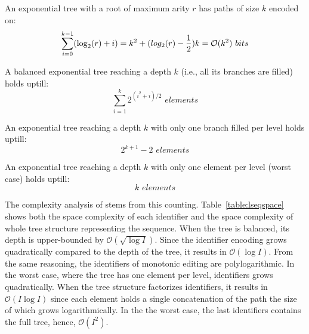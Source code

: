 \begin{asparadesc}
  An exponential tree with a root of maximum arity $r$ has paths of size $k$
  encoded on:
  \begin{equation}
    \sum\limits_{i=0}^{k-1}(\log_2(r)+i) =k^2+(log_2(r)-{1\over{2}})k =
    \mathcal{O}(k^2) \,\, bits
  \end{equation}

  A balanced exponential tree reaching a depth $k$ (i.e., all its branches are
  filled) holds uptill:
  \begin{equation}
    \sum\limits_{i=1}^{k} {2^{(i^2+i)/2}} \,\, elements
  \end{equation}

  An exponential tree reaching a depth $k$ with only one branch filled per level
  holds uptill:
  \begin{equation}
    2^{k+1}-2 \,\, elements
  \end{equation}

  An exponential tree reaching a depth $k$ with only one element per level
  (worst case) holds uptill: 
  \begin{equation}
    k \,\, elements
  \end{equation}

  
\item [The complexity analysis of \LSEQ] stems from this
  counting. Table~\ref{table:lseqspace} shows both the space complexity of each
  identifier and the space complexity of whole tree structure representing the
  sequence. When the tree is balanced, its depth is upper-bounded by
  $\mathcal{O}(\sqrt{\log I})$. Since the identifier encoding grows
  quadratically compared to the depth of the tree, it results in
  $\mathcal{O}(\log I)$. From the same reasoning, the identifiers of monotonic
  editing are polylogarithmic. In the worst case, where the tree has one element
  per level, identifiers grows quadratically. When the tree structure factorizes
  identifiers, it results in $\mathcal{O}(I\log I)$ since each element holds a
  single concatenation of the path the size of which grows logarithmically.  In
  the the worst case, the last identifiers contains the full tree, hence,
  $\mathcal{O}(I^2)$.

  

\end{asparadesc}
